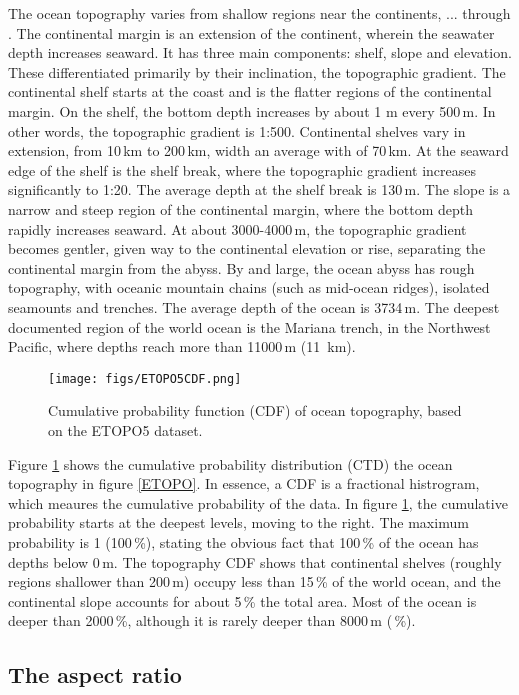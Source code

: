 \documentclass[11pt]{article}
\begin{document}
The ocean topography varies from shallow regions near the continents, ... through .
The continental margin is an extension of the continent, wherein the seawater depth increases seaward. It has three main components: shelf, slope and elevation. These differentiated primarily by
their inclination, the topographic gradient. The continental shelf starts at the coast and is the
flatter regions of the continental margin. On the shelf, the bottom depth increases by about 1 m
every 500\,m. In other words, the topographic gradient is 1:500. Continental shelves vary in extension, from 10\,km to 200\,km, width an average with
of 70\,km. At the seaward edge of the shelf is the shelf break, where the topographic gradient increases
significantly to 1:20. The average depth at the shelf break is 130\,m. The slope is a narrow and steep region of the continental margin, where the bottom depth rapidly increases seaward. At about 3000-4000\,m, the topographic gradient becomes gentler, given way to the continental elevation or rise, separating the
continental margin from the abyss. By and large, the ocean abyss has rough topography, with oceanic mountain chains (such as mid-ocean ridges), isolated seamounts and trenches. The average depth of the ocean is 3734\,m. The deepest documented region of the world ocean is the Mariana trench,
in the Northwest Pacific, where depths reach more than 11000\,m (11\, km).

\begin{figure}[ht]
\centering
\texttt{[image: figs/ETOPO5CDF.png]}
\caption{\small Cumulative probability function (CDF) of ocean topography, based on the ETOPO5 dataset.}
\label{ETOPOCDF}
\end{figure}

Figure \ref{ETOPOCDF} shows the cumulative probability distribution (CTD) the ocean
topography in figure \ref{ETOPO}. In essence, a CDF is a fractional histrogram, which
meaures the cumulative probability of the data.  In figure \ref{ETOPOCDF}, the cumulative
probability starts at the deepest levels, moving to the right. The maximum probability is
1 (100\,\%), stating the obvious fact that 100\,\% of the ocean has depths below 0\,m. The topography CDF
shows that continental shelves (roughly regions shallower than 200\,m) occupy less than 15\,\% of
the world ocean, and the continental slope accounts for about 5\,\% the total area. Most of the ocean
is deeper than 2000\,\%, although it is rarely deeper than 8000\,m (\,\%).


\subsection{The aspect ratio}
\end{document}
